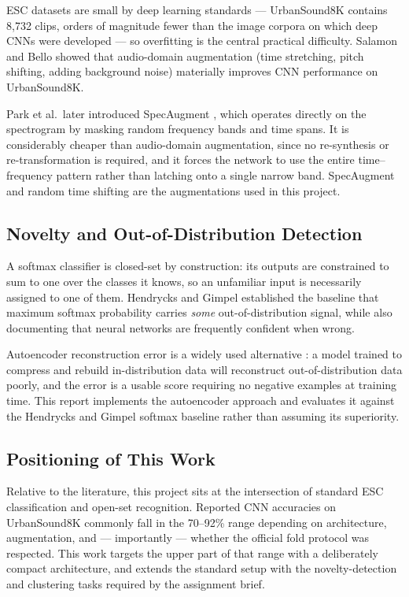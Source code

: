 \documentclass[11pt, a4paper]{article}
\begin{document}
ESC datasets are small by deep learning standards --- UrbanSound8K contains 8,732 clips, orders of magnitude fewer than the image corpora on which deep CNNs were developed --- so overfitting is the central practical difficulty. Salamon and Bello \cite{salamon2017} showed that audio-domain augmentation (time stretching, pitch shifting, adding background noise) materially improves CNN performance on UrbanSound8K.

Park et al.\ later introduced SpecAugment \cite{park2019}, which operates directly on the spectrogram by masking random frequency bands and time spans. It is considerably cheaper than audio-domain augmentation, since no re-synthesis or re-transformation is required, and it forces the network to use the entire time--frequency pattern rather than latching onto a single narrow band. SpecAugment and random time shifting are the augmentations used in this project.

\subsection{Novelty and Out-of-Distribution Detection}

A softmax classifier is closed-set by construction: its outputs are constrained to sum to one over the classes it knows, so an unfamiliar input is necessarily assigned to one of them. Hendrycks and Gimpel \cite{hendrycks2017} established the baseline that maximum softmax probability carries \emph{some} out-of-distribution signal, while also documenting that neural networks are frequently confident when wrong.

Autoencoder reconstruction error is a widely used alternative \cite{sakurada2014}: a model trained to compress and rebuild in-distribution data will reconstruct out-of-distribution data poorly, and the error is a usable score requiring no negative examples at training time. This report implements the autoencoder approach and evaluates it against the Hendrycks and Gimpel softmax baseline rather than assuming its superiority.

\subsection{Positioning of This Work}

Relative to the literature, this project sits at the intersection of standard ESC classification and open-set recognition. Reported CNN accuracies on UrbanSound8K commonly fall in the 70--92\% range depending on architecture, augmentation, and --- importantly --- whether the official fold protocol was respected. This work targets the upper part of that range with a deliberately compact architecture, and extends the standard setup with the novelty-detection and clustering tasks required by the assignment brief.
\end{document}
